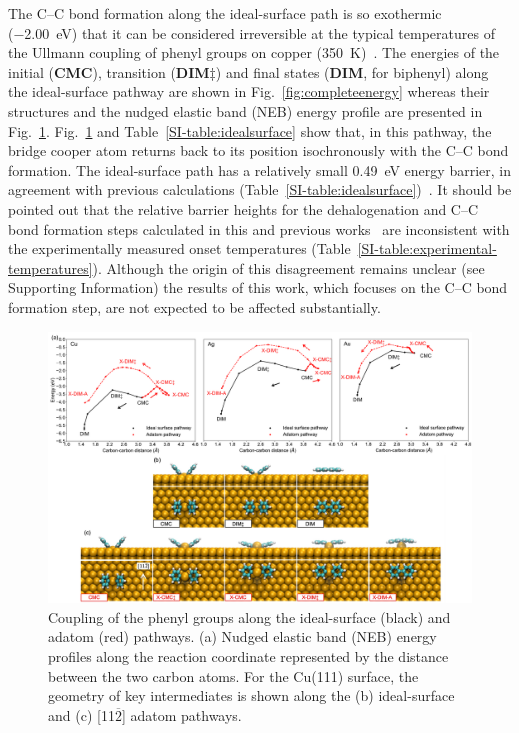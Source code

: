 \documentclass[aps,prb,amsmath,amssymb,11pt]{revtex4-1}
\newcommand{\sinfo}{Supporting Information}
\newcommand{\zhzh}{\color{black}}
\begin{document}
The C--C bond formation along the ideal-surface path is so exothermic (\SI{-2.00}{\electronvolt}) that it can be considered irreversible at the typical temperatures of the Ullmann coupling of phenyl groups on copper (\SI{350}{\kelvin})~\cite{ullmann_67, sur_sci01}. The energies of the initial (\textbf{CMC}), transition (\textbf{DIM$\ddagger$}) and final states (\textbf{DIM}, for biphenyl) along the ideal-surface pathway are shown in Fig.~\ref{fig:completeenergy} whereas their structures and the nudged elastic band (NEB) energy profile are presented in Fig.~\ref{fig:distance-energy-main}. 
Fig.~\ref{fig:distance-energy-main} and Table~\ref{SI-table:idealsurface} show that, in this pathway, the bridge cooper atom returns back to its position isochronously with the C--C bond formation. 
The ideal-surface path has a relatively small \SI{0.49}{\electronvolt} energy barrier, in agreement with previous calculations (Table~\ref{SI-table:idealsurface})~\cite{pccp2010, jacs2013}. %
%
{\zhzh It should be pointed out that the relative barrier heights for the dehalogenation and C--C bond formation steps calculated in this and previous works~\cite{pccp2010, jacs2013} are inconsistent with the experimentally measured onset temperatures (Table~\ref{SI-table:experimental-temperatures}). Although the origin of this disagreement remains unclear (see \sinfo) the results of this work, which focuses on the C--C bond formation step, are not expected to be affected substantially.}

\begin{figure}[bt]
\centering
\includegraphics[width=1.0\textwidth]{Fig/distance-energy-main.pdf}
\caption{Coupling of the phenyl groups along the ideal-surface (black) and adatom (red) pathways. (a) Nudged elastic band (NEB) energy profiles along the reaction coordinate represented by the distance between the two carbon atoms. For the Cu(111) surface, the geometry of key intermediates is shown along the (b) ideal-surface and (c) [11$\overline{2}$] adatom pathways.}
\label{fig:distance-energy-main}
\end{figure}
\end{document}
